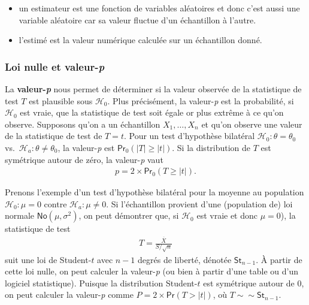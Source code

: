 \documentclass[
  11pt,
  letterpaper,
]{article}
\providecommand{\tightlist}{%
  \setlength{\itemsep}{0pt}\setlength{\parskip}{0pt}}
\theoremstyle{definition}
\theoremstyle{definition}
\theoremstyle{definition}
\theoremstyle{remark}
\begin{document}
\begin{itemize}
\tightlist
\item
  un estimateur est une fonction de variables aléatoires et donc c'est aussi une variable aléatoire car sa valeur fluctue d'un échantillon à l'autre.
\item
  l'estimé est la valeur numérique calculée sur un échantillon donné.
\end{itemize}

\hypertarget{loi-nulle-et-valeur-p}{%
\subsubsection{\texorpdfstring{Loi nulle et valeur-\emph{p}}{Loi nulle et valeur-p}}\label{loi-nulle-et-valeur-p}}

La \textbf{valeur-\emph{p}} nous permet de déterminer si la valeur observée de la statistique de test \(T\) est plausible sous \(\mathscr{H}_0\). Plus précisément, la valeur-\emph{p} est la probabilité, si \(\mathscr{H}_0\) est vraie, que la statistique de test soit égale or plus extrême à ce qu'on observe. Supposons qu'on a un échantillon \(X_1, \ldots, X_n\) et qu'on observe une valeur de la statistique de test de \(T=t\). Pour un test d'hypothèse bilatéral \(\mathscr{H}_0:\theta=\theta_0\) vs.~\(\mathscr{H}_a:\theta \neq \theta_0\), la valeur-\emph{p} est
\(\mathsf{Pr}_0(|T| \geq |t|)\). Si la distribution de \(T\) est symétrique autour de zéro, la valeur-\emph{p} vaut
\begin{align*}
p = 2 \times \mathsf{Pr}_0(T \geq |t|).
\end{align*}

Prenons l'exemple d'un test d'hypothèse bilatéral pour la moyenne au population \(\mathscr{H}_0:\mu=0\) contre \(\mathscr{H}_a:\mu \neq 0\). Si l'échantillon provient d'une (population de) loi normale \(\mathsf{No}(\mu, \sigma^2)\), on peut démontrer que, si \(\mathscr{H}_0\) est vraie et donc \(\mu=0\)), la statistique de test
\begin{align*}
T = \frac{\overline{X}}{S/\sqrt{n}}
\end{align*}
suit une loi de Student-\(t\) avec \(n-1\) degrés de liberté, dénotée \(\mathsf{St}_{n-1}\). À partir de cette loi nulle, on peut calculer la valeur-\emph{p} (ou bien à partir d'une table ou d'un logiciel statistique). Puisque la distribution Student-\(t\) est symétrique autour de \(0\), on peut calculer la valeur-\emph{p} comme \(P = 2\times\mathsf{Pr}(T > |t|)\), où \(T \sim \sim \mathsf{St}_{n-1}\).
\end{document}
